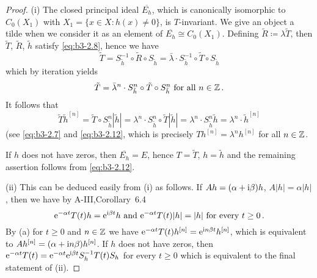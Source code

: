 \begin{proof}
	(i) The closed principal ideal $\overline{E_{h}}$, which is canonically isomorphic to $C_{0}(X_{1})$ with $X_{1} = \{x \in X \colon h(x) \neq 0\}$, is $T$-invariant.
	We give an object a tilde when we consider it as an element of $\overline{E_{h}} \cong C_{0}(X_{1})$.
	Defining $\tilde{R} \coloneqq \lambda\tilde{T}$, then $\tilde{T}$, $\tilde{R}$, $\tilde{h}$ satisfy \eqref{eq:b3-2.8}, hence we have
	\begin{equation}\label{eq:b3-2.12}
		\tilde{T} = S_{\tilde{h}}^{-1} \circ \tilde{R} \circ S_{\tilde{h}} = \bar{\lambda} \cdot S_{\tilde{h}}^{-1} \circ \tilde{T} \circ S_{\tilde{h}}
	\end{equation}
	which by iteration yields
	\begin{equation}\label{eq:b3-2.13}
		\tilde{T} = \bar{\lambda}^{n} \cdot S_{\tilde{h}}^{n} \circ \tilde{T} \circ S_{\tilde{h}}^{n} \text{ for all } n \in \mathbb{Z}\,.
	\end{equation}
	It follows that
		\begin{equation*}
		\tilde{T}\tilde{h}^{[n]} = \tilde{T} \circ S_{\tilde{h}}^{n}|\tilde{h}| = \lambda^{n} \cdot S_{\tilde{h}}^{n} \circ \tilde{T}|\tilde{h}| 
		= \lambda^{n} \cdot S_{\tilde{h}}^{n}\tilde{h} = \lambda^{n} \cdot \tilde{h}^{[n]}
	\end{equation*}
	(see \eqref{eq:b3-2.7} and \eqref{eq:b3-2.12}, which is precisely $Th^{[n]} = \lambda^{n}h^{[n]}$ for all $n \in \mathbb{Z}$.
	
	If $h$ does not have zeros, then $\overline{E_{h}} = E$, hence $T = \tilde{T}$, $h = \tilde{h}$ and the remaining assertion follows from \eqref{eq:b3-2.12}.

	(ii) This can be deduced easily from (i) as follows. 
	If $Ah = (\alpha+\mathrm{i}\beta )h$, $A|h| = \alpha|h|$, then we have by A-III,Corollary~6.4
	\[
	\mathrm{e}^{-\alpha t}T(t)h = \mathrm{e}^{\mathrm{i}\beta  t}h \text{ and } \mathrm{e}^{-\alpha t}T(t)|h| = |h| \text{ for every } t \geq 0\,.
	\]
	By (a) for $t \geq 0$ and $n \in \mathbb{Z}$ we have
    $\mathrm{e}^{-\alpha t}T(t)h^{[n]} = \mathrm{e}^{\mathrm{i} n\beta t}h^{[n]}$, which is equivalent to $Ah^{[n]} = (\alpha+\mathrm{i} n\beta)h^{[n]}$.
	If $h$ does not have zeros, then $\mathrm{e}^{-\alpha t}T(t) = \mathrm{e}^{-\alpha t}\mathrm{e}^{\mathrm{i}\beta  t}S_{h}^{-1}T(t)S_{h}$ for every $t \geq 0$ which is equivalent to the final statement of (ii).
	\end{proof}
